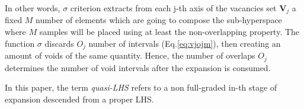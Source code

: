 \documentclass[12pt]{extarticle}
\newcommand{\meqref}[1]{Eq.\ref{#1}}
\begin{document}
In other words, $\sigma$ criterion extracts from each j-th axis of the vacancies set $\textbf{V}_j$ a fixed $M$ number of elements which are going to compose the sub-hyperspace where $M$ samples will be placed using at least the non-overlapping property. The function $\sigma$ discards $O_j$ number of intervals (\meqref{eq:vjojm}), then creating an amount of voids of the same quantity. Hence, the number of overlaps $O_j$ determines the number of void intervals after the expansion is consumed.

In this paper, the term \textit{quasi-LHS} refers to a non full-graded in-th stage of expansion descended from a proper LHS.

\begin{figure}[]
    \centering
    \begin{subfigure}[b]{0.45\textwidth}
        \centering
    \end{subfigure}
    \hspace{0.05\textwidth}
    \begin{subfigure}[b]{0.45\textwidth}
        \centering
        \vtop{
        	\vspace{0pt}
}
\end{subfigure}
\end{figure}
\end{document}
